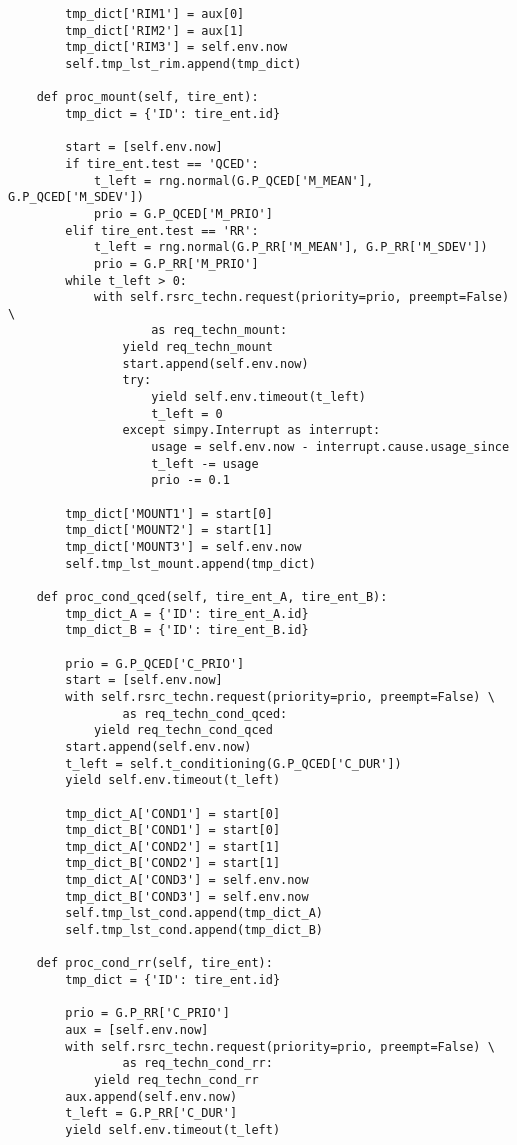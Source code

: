 \begin{verbatim}
        tmp_dict['RIM1'] = aux[0]
        tmp_dict['RIM2'] = aux[1]
        tmp_dict['RIM3'] = self.env.now
        self.tmp_lst_rim.append(tmp_dict)

    def proc_mount(self, tire_ent):
        tmp_dict = {'ID': tire_ent.id}

        start = [self.env.now]
        if tire_ent.test == 'QCED':
            t_left = rng.normal(G.P_QCED['M_MEAN'], G.P_QCED['M_SDEV'])
            prio = G.P_QCED['M_PRIO']
        elif tire_ent.test == 'RR':
            t_left = rng.normal(G.P_RR['M_MEAN'], G.P_RR['M_SDEV'])
            prio = G.P_RR['M_PRIO']
        while t_left > 0:
            with self.rsrc_techn.request(priority=prio, preempt=False) \
                    as req_techn_mount:
                yield req_techn_mount
                start.append(self.env.now)
                try:
                    yield self.env.timeout(t_left)
                    t_left = 0
                except simpy.Interrupt as interrupt:
                    usage = self.env.now - interrupt.cause.usage_since
                    t_left -= usage
                    prio -= 0.1

        tmp_dict['MOUNT1'] = start[0]
        tmp_dict['MOUNT2'] = start[1]
        tmp_dict['MOUNT3'] = self.env.now
        self.tmp_lst_mount.append(tmp_dict)

    def proc_cond_qced(self, tire_ent_A, tire_ent_B):
        tmp_dict_A = {'ID': tire_ent_A.id}
        tmp_dict_B = {'ID': tire_ent_B.id}

        prio = G.P_QCED['C_PRIO']
        start = [self.env.now]
        with self.rsrc_techn.request(priority=prio, preempt=False) \
                as req_techn_cond_qced:
            yield req_techn_cond_qced
        start.append(self.env.now)
        t_left = self.t_conditioning(G.P_QCED['C_DUR'])
        yield self.env.timeout(t_left)

        tmp_dict_A['COND1'] = start[0]
        tmp_dict_B['COND1'] = start[0]
        tmp_dict_A['COND2'] = start[1]
        tmp_dict_B['COND2'] = start[1]
        tmp_dict_A['COND3'] = self.env.now
        tmp_dict_B['COND3'] = self.env.now
        self.tmp_lst_cond.append(tmp_dict_A)
        self.tmp_lst_cond.append(tmp_dict_B)

    def proc_cond_rr(self, tire_ent):
        tmp_dict = {'ID': tire_ent.id}

        prio = G.P_RR['C_PRIO']
        aux = [self.env.now]
        with self.rsrc_techn.request(priority=prio, preempt=False) \
                as req_techn_cond_rr:
            yield req_techn_cond_rr
        aux.append(self.env.now)
        t_left = G.P_RR['C_DUR']
        yield self.env.timeout(t_left)


\end{verbatim}
